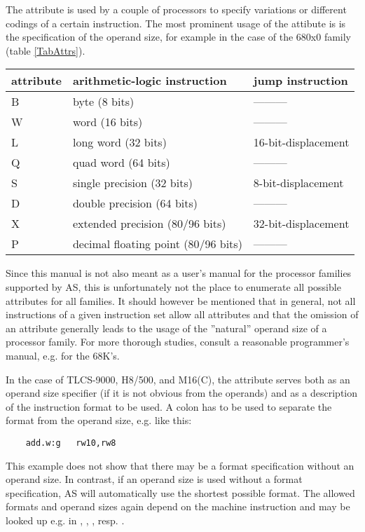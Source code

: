\documentclass[12pt,twoside]{report}
\begin{document}
The attribute is used by a couple of processors to specify variations or
different codings of a certain instruction.  The most prominent usage of
the attibute is is the specification of the operand size, for example in
the case of the 680x0 family (table \ref{TabAttrs}).
\begin{table*}[htb]
\begin{center}\begin{tabular}{|l|l|l|}
\hline
attribute & arithmetic-logic instruction & jump instruction\\
\hline
\hline
B     & byte (8 bits)                       &  --------- \\
W     & word (16 bits)                      &  --------- \\
L     & long word (32 bits)                 &  16-bit-displacement \\
Q     & quad word (64 bits)                 &  --------- \\
S     & single precision (32 bits)          &  8-bit-displacement \\
D     & double precision (64 bits)          &  --------- \\
X     & extended precision (80/96 bits)     &  32-bit-displacement \\
P     & decimal floating point (80/96 bits) &  --------- \\
\hline
\end{tabular}\end{center}
\caption{Allowed Attributes (Example 680x0) \label{TabAttrs}}
\end{table*}
\par
Since this manual is not also meant as a user's manual for the processor
families supported by AS, this is unfortunately not the place to enumerate
all possible attributes for all families.  It should however be mentioned
that in general, not all instructions of a given instruction set allow all
attributes and that the omission of an attribute generally leads to the
usage of the ''natural'' operand size of a processor family. For more
thorough studies, consult a reasonable programmer's manual, e.g.
\cite{Williams} for the 68K's.

In the case of TLCS-9000, H8/500, and M16(C), the attribute serves
both as an operand size specifier (if it is not obvious from the
operands) and as a description of the instruction format to be used. 
A colon has to be used to separate the format from the operand size,
e.g. like this:
\begin{verbatim}
    add.w:g   rw10,rw8
\end{verbatim}
This example does not show that there may be a format specification
without an operand size.  In contrast, if an operand size is used
without a format specification, AS will automatically use the
shortest possible format.  The allowed formats and operand sizes
again depend on the machine instruction and may be looked up e.g. in
\cite{Tosh900}, \cite{HitH8_5}, \cite{MitM16}, resp. \cite{MitM16C}.
\end{document}
